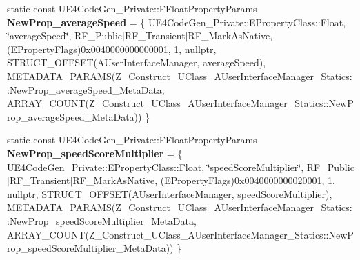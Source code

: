 \begin{DoxyCompactItemize}
\item 
\mbox{\label{struct_z___construct___u_class___a_user_interface_manager___statics_a1e304f7a88bfd6b90321a8ecc9c0413f}} 
static const U\+E4\+Code\+Gen\+\_\+\+Private\+::\+F\+Float\+Property\+Params {\bfseries New\+Prop\+\_\+average\+Speed} = \{ U\+E4\+Code\+Gen\+\_\+\+Private\+::\+E\+Property\+Class\+::\+Float, \char`\"{}average\+Speed\char`\"{}, R\+F\+\_\+\+Public$\vert$R\+F\+\_\+\+Transient$\vert$R\+F\+\_\+\+Mark\+As\+Native, (E\+Property\+Flags)0x0040000000000001, 1, nullptr, S\+T\+R\+U\+C\+T\+\_\+\+O\+F\+F\+S\+E\+T(\+A\+User\+Interface\+Manager, average\+Speed), M\+E\+T\+A\+D\+A\+T\+A\+\_\+\+P\+A\+R\+A\+M\+S(\+Z\+\_\+\+Construct\+\_\+\+U\+Class\+\_\+\+A\+User\+Interface\+Manager\+\_\+\+Statics\+::\+New\+Prop\+\_\+average\+Speed\+\_\+\+Meta\+Data, A\+R\+R\+A\+Y\+\_\+\+C\+O\+U\+N\+T(\+Z\+\_\+\+Construct\+\_\+\+U\+Class\+\_\+\+A\+User\+Interface\+Manager\+\_\+\+Statics\+::\+New\+Prop\+\_\+average\+Speed\+\_\+\+Meta\+Data)) \}
\item 
\mbox{\label{struct_z___construct___u_class___a_user_interface_manager___statics_a227b3ed1416d523974704474e28ec0d4}} 
static const U\+E4\+Code\+Gen\+\_\+\+Private\+::\+F\+Float\+Property\+Params {\bfseries New\+Prop\+\_\+speed\+Score\+Multiplier} = \{ U\+E4\+Code\+Gen\+\_\+\+Private\+::\+E\+Property\+Class\+::\+Float, \char`\"{}speed\+Score\+Multiplier\char`\"{}, R\+F\+\_\+\+Public$\vert$R\+F\+\_\+\+Transient$\vert$R\+F\+\_\+\+Mark\+As\+Native, (E\+Property\+Flags)0x0040000000020001, 1, nullptr, S\+T\+R\+U\+C\+T\+\_\+\+O\+F\+F\+S\+E\+T(\+A\+User\+Interface\+Manager, speed\+Score\+Multiplier), M\+E\+T\+A\+D\+A\+T\+A\+\_\+\+P\+A\+R\+A\+M\+S(\+Z\+\_\+\+Construct\+\_\+\+U\+Class\+\_\+\+A\+User\+Interface\+Manager\+\_\+\+Statics\+::\+New\+Prop\+\_\+speed\+Score\+Multiplier\+\_\+\+Meta\+Data, A\+R\+R\+A\+Y\+\_\+\+C\+O\+U\+N\+T(\+Z\+\_\+\+Construct\+\_\+\+U\+Class\+\_\+\+A\+User\+Interface\+Manager\+\_\+\+Statics\+::\+New\+Prop\+\_\+speed\+Score\+Multiplier\+\_\+\+Meta\+Data)) \}
\item 
\mbox{\label{struct_z___construct___u_class___a_user_interface_manager___statics_ab6cb54f564357ba61710154f24a539a0}} 

\end{DoxyCompactItemize}
